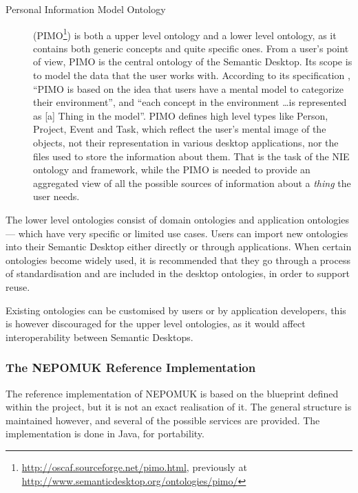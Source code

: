 \begin{description}
 \item[Personal Information Model Ontology] (PIMO\footnote{\url{http://oscaf.sourceforge.net/pimo.html}, previously at \url{http://www.semanticdesktop.org/ontologies/pimo/}}) is both a upper level ontology and a lower level ontology, as it contains both generic concepts and quite specific ones. From a user's point of view, PIMO is the central ontology of the Semantic Desktop. Its scope is to model the data that the user works with. According to its specification \cite{Sauermann2009a}, ``PIMO is based on the idea that users have a mental model to categorize their environment'', and ``each concept in the environment \dots is represented as [a] Thing in the model''. PIMO defines high level types like Person, Project, Event and Task, which reflect the user's mental image of the objects, not their representation in various desktop applications, nor the files used to store the information about them. That is the task of the NIE ontology and framework, while the PIMO is needed to provide an aggregated view of all 
the possible sources of information about a \emph{thing} the user needs.
\end{description}

The lower level ontologies consist of domain ontologies and application ontologies --- which have very specific or limited use cases. 
Users can import new ontologies into their Semantic Desktop either directly or through applications. When certain ontologies become widely used, it is recommended that they go through a process of standardisation and are included in the desktop ontologies, in order to support reuse. 

Existing ontologies can be customised by users or by application developers, this is however discouraged for the upper level ontologies, as it would affect interoperability between Semantic Desktops.

\subsubsection{The NEPOMUK Reference Implementation}

The reference implementation of NEPOMUK is based on the blueprint defined within the project, but it is not an exact realisation of it. The general structure is maintained however, and several of the possible services are provided. The implementation is done in Java, for portability.

